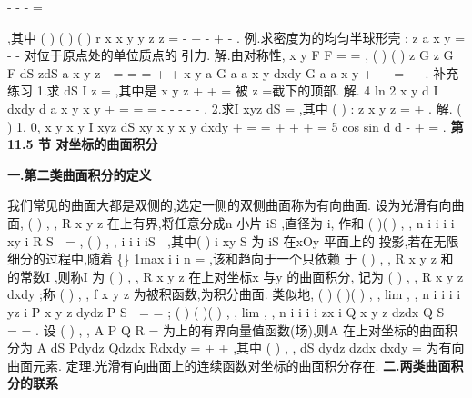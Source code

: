 -
-
-
=



\int \int 
\int \int 
\int \int 
\rho 
,其中 
(
)
(
)
(
)
r
x
x
y
y
z
z
=
-
+
-
+
-
. 
\textcolor{lyred}{例}.求密度为\mu 的均匀半球形壳
: z
a
x
y
\Sigma 
=
-
-
对位于原点处的单位质点的 
引力. 
解.由对称性,
x
y
F
F
=
=
,
(
)
(
)
z
G
z
G
F
dS
zdS
a
x
y
z
\mu 
\mu 
\Sigma 
\Sigma 
-
=
=
=
+
+
\int \int 
\int \int 
x
y
a
G
a
a
x
y
dxdy
G
a
a
x
y
\mu 
\mu \pi 
+
\le 
-
-
\cdots 
=
-
-
\int \int 
. 
\textcolor{lyred}{补充练习 }
1.求
dS
I
z
\Sigma 
=\int \int 
,其中\Sigma 是
x
y
z
+
+
=
被
z =截下的顶部. 
解.
4 ln 2
x
y
d
I
dxdy
d
a
x
y
x
y
\pi 
\rho \rho 
\theta 
\pi 
\rho 
+
\le 
=
\cdots 
=
=
-
-
-
-
-
\int \int 
\int 
\int 
. 
2.求I
xyz dS
\Sigma 
=\int \int 
,其中
(
)
:
z
x
y
z
\Sigma 
=
+
\le 
\le 
. 
解.
(
)
1,
0,
x
y
x
y
I
xyz dS
xy x
y
x
y dxdy
\Sigma 
+
\le 
\ge 
\ge 
=
\cdots 
=
+
+
+
=
\int \int 
\int {} 5
cos sin
d
d
\pi 
\theta \rho 
\theta 
\theta \rho 
\rho 
\rho \rho 
-
\cdots 
+
\cdots 
=
\int 
\int 
. 
\vspace{6pt}
{\large \bfseries \textcolor{lyred}{第11.5 节 对坐标的曲面积分}}

\vspace{4pt}
{\bfseries \textcolor{lyred}{一.第二类曲面积分的定义}}

我们常见的曲面大都是\textcolor{lyred}{双侧的},选定一侧的双侧曲面称为\textcolor{lyred}{有向曲面}. 
设\Sigma 为光滑有向曲面,
(
)
, ,
R x y z 在\Sigma 上有界,将\Sigma 任意分成n 小片
iS
\Delta 
,直径为
i\lambda , 
作和
(
)(
)
,
,
n
i
i
i
i
xy
i
R
S
\psi \eta 
=
\Delta 
\sum 
, (
)
,
,
i
i
i
iS
\psi \eta 
\forall 
\in \Delta 
,其中(
)
i
xy
S
\Delta 
为
iS
\Delta 
在xOy 平面上的 
投影,若在无限细分\Sigma 的过程中,随着
\{\}
1max
i
i n
\lambda 
\lambda 
\le \le 
=
\to 
,该和趋向于一个只依赖 
于
(
)
, ,
R x y z 和\Sigma 的常数I ,则称I 为
(
)
, ,
R x y z 在\Sigma 上\textcolor{lyred}{对坐标x 与y 的曲面积分}, 
记为
(
)
, ,
R x y z dxdy
\Sigma \int \int 
;称
(
)
, ,
f x y z 为\textcolor{lyred}{被积函数},\Sigma 为\textcolor{lyred}{积分曲面}. 
类似地,
(
)
(
)(
)
, ,
lim
,
,
n
i
i
i
i
yz
i
P x y z dydz
P
S
\lambda 
\psi \eta 
\to 
=
\Sigma 
=
\Delta 
\sum 
\int \int 
; 
(
)
(
)(
)
, ,
lim
,
,
n
i
i
i
i
zx
i
Q x y z dzdx
Q
S
\lambda 
\psi \eta 
\to 
=
\Sigma 
=
\Delta 
\sum 
\int \int 
. 
设
(
)
,
,
A
P Q R
=
\rho 
为\Sigma 上的有界向量值函数(场),则A
\rho 
在\Sigma 上\textcolor{lyred}{对坐标的曲面积分}为 
A dS
Pdydz
Qdzdx
Rdxdy
\Sigma 
\Sigma 
\cdots 
=
+
+
\int \int 
\int \int 
\rho 
\rho 
,其中
(
)
,
,
dS
dydz dzdx dxdy
=
\rho 
为\textcolor{lyred}{有向曲面元素}. 
\textcolor{lyred}{定理}.光滑有向曲面上的连续函数对坐标的曲面积分存在. 
\vspace{4pt}
{\bfseries \textcolor{lyred}{二.两类曲面积分的联系}}

